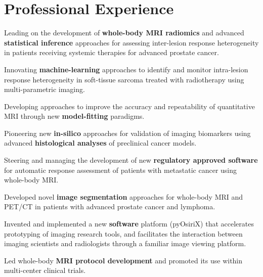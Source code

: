 \documentclass[]{mbcv}
\begin{document}
\hfill
\begin{minipage}[t]{0.65\textwidth}

\section{Professional Experience}
\vspace*{10pt}
\begin{tightemize}

\item Leading on the development of \textbf{whole-body MRI radiomics} and advanced \textbf{statistical inference} approaches for assessing inter-lesion response heterogeneity in patients receiving systemic therapies for advanced prostate cancer.

\item Innovating \textbf{machine-learning} approaches to identify and monitor intra-lesion response heterogeneity in soft-tissue sarcoma treated with radiotherapy using multi-parametric imaging.

\item Developing approaches to improve the accuracy and repeatability of quantitative MRI through new \textbf{model-fitting} paradigms.

\item Pioneering new \textbf{in-silico} approaches for validation of imaging biomarkers using advanced \textbf{histological analyses} of preclinical cancer models.

\item Steering and managing the development of new \textbf{regulatory approved software} for automatic response assessment of patients with metastatic cancer using whole-body MRI.

\end{tightemize}
\sectionsep

\begin{tightemize}
\item Developed novel \textbf{image segmentation} approaches for whole-body MRI and PET/CT in patients with advanced prostate cancer and lymphoma.
\item Invented and implemented a new \textbf{software} platform (pyOsiriX) that accelerates prototyping of imaging research tools, and facilitates the interaction between imaging scientists and radiologists through a familiar image viewing platform.
\item Led whole-body \textbf{MRI protocol development} and promoted its use within multi-center clinical trials. 
\end{tightemize}
\sectionsep


\end{minipage}
\end{document}

